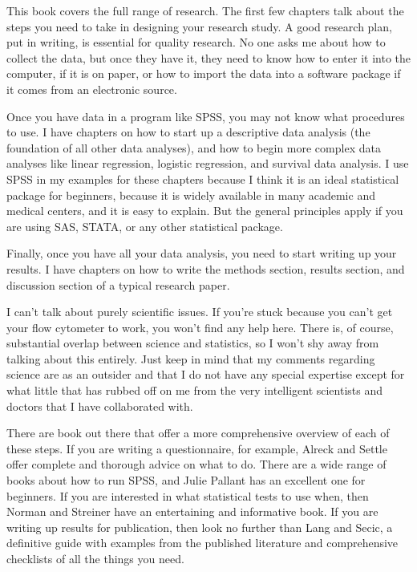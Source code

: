 \documentclass[
  letterpaper,
  DIV=11,
  numbers=noendperiod]{scrreprt}
\begin{document}
This book covers the full range of research. The first few chapters talk
about the steps you need to take in designing your research study. A
good research plan, put in writing, is essential for quality research.
No one asks me about how to collect the data, but once they have it,
they need to know how to enter it into the computer, if it is on paper,
or how to import the data into a software package if it comes from an
electronic source.

Once you have data in a program like SPSS, you may not know what
procedures to use. I have chapters on how to start up a descriptive data
analysis (the foundation of all other data analyses), and how to begin
more complex data analyses like linear regression, logistic regression,
and survival data analysis. I use SPSS in my examples for these chapters
because I think it is an ideal statistical package for beginners,
because it is widely available in many academic and medical centers, and
it is easy to explain. But the general principles apply if you are using
SAS, STATA, or any other statistical package.

Finally, once you have all your data analysis, you need to start writing
up your results. I have chapters on how to write the methods section,
results section, and discussion section of a typical research paper.

I can't talk about purely scientific issues. If you're stuck because you
can't get your flow cytometer to work, you won't find any help here.
There is, of course, substantial overlap between science and statistics,
so I won't shy away from talking about this entirely. Just keep in mind
that my comments regarding science are as an outsider and that I do not
have any special expertise except for what little that has rubbed off on
me from the very intelligent scientists and doctors that I have
collaborated with.

There are book out there that offer a more comprehensive overview of
each of these steps. If you are writing a questionnaire, for example,
Alreck and Settle offer complete and thorough advice on what to do.
There are a wide range of books about how to run SPSS, and Julie Pallant
has an excellent one for beginners. If you are interested in what
statistical tests to use when, then Norman and Streiner have an
entertaining and informative book. If you are writing up results for
publication, then look no further than Lang and Secic, a definitive
guide with examples from the published literature and comprehensive
checklists of all the things you need.
\end{document}
